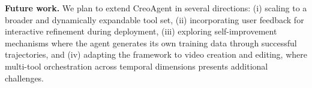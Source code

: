 \documentclass[11pt]{article}
\begin{document}
\textbf{Future work.} We plan to extend CreoAgent in several directions: (i) scaling to a broader and dynamically expandable tool set, (ii) incorporating user feedback for interactive refinement during deployment, (iii) exploring self-improvement mechanisms where the agent generates its own training data through successful trajectories, and (iv) adapting the framework to video creation and editing, where multi-tool orchestration across temporal dimensions presents additional challenges.


% 
\end{document}
